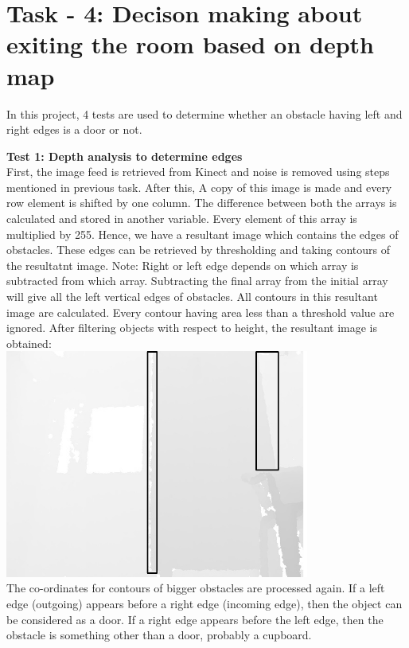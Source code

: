 \documentclass{report}
\begin{document}
\section{Task - 4: Decison making about exiting the room based on depth map}

In this project, 4 tests are used to determine whether an obstacle having left and right edges is a door or not.

\textbf{Test 1: Depth analysis to determine edges} \\

First, the image feed is retrieved from Kinect and noise is removed using steps mentioned in previous task. After this,
 A copy of this image is made and every row element is shifted by one column. The difference between both the arrays is calculated and stored in another variable. 
 Every element of this array is multiplied by 255. Hence, we have a resultant image which contains 
 the edges of obstacles. These edges can be retrieved by thresholding and taking contours of the 
 resultatnt image. Note: Right or left edge depends on which array is subtracted from which array. 
 Subtracting the final array from the initial array will give all the left vertical edges of obstacles. 
 All contours in this resultant image are calculated. Every contour having area less than a threshold value are ignored. After filtering objects with respect to 
 height, the resultant image is obtained: \\

\includegraphics[width = 10cm]{result.jpg} \\

The co-ordinates for contours of bigger obstacles are processed again. If a left edge (outgoing) 
appears before a right edge (incoming edge), then the object can be considered as a door. If a right 
edge appears  before the left edge, then the obstacle is something other than a door, probably a
cupboard.
\end{document}
